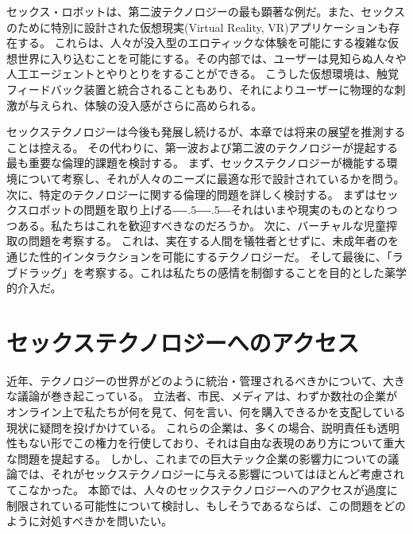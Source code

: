 \documentclass[paper=a4,book,openany]{jlreq}
\def\DDASH{―\kern-.5\zw―\kern-.5\zw―} %
\begin{document}
セックス・ロボットは、第二波テクノロジーの最も顕著な例だ。また、セックスのために特別に設計された仮想現実(Virtual Reality, VR)アプリケーションも存在する。
これらは、人々が没入型のエロティックな体験を可能にする複雑な仮想世界に入り込むことを可能にする。その内部では、ユーザーは見知らぬ人々や人工エージェントとやりとりをすることができる。
こうした仮想環境は、触覚フィードバック装置と統合されることもあり、それによりユーザーに物理的な刺激が与えられ、体験の没入感がさらに高められる。

セックステクノロジーは今後も発展し続けるが、本章では将来の展望を推測することは控える。
その代わりに、第一波および第二波のテクノロジーが提起する最も重要な倫理的課題を検討する。
まず、セックステクノロジーが機能する環境について考察し、それが人々のニーズに最適な形で設計されているかを問う。
次に、特定のテクノロジーに関する倫理的問題を詳しく検討する。
まずはセックスロボットの問題を取り上げる{\DDASH}それはいまや現実のものとなりつつある。私たちはこれを歓迎すべきなのだろうか。
次に、バーチャルな児童搾取の問題を考察する。
これは、実在する人間を犠牲者とせずに、未成年者のを通じた性的インタラクションを可能にするテクノロジーだ。
そして最後に、「ラブドラッグ」を考察する。これは私たちの感情を制御することを目的とした薬学的介入だ。

\section{セックステクノロジーへのアクセス}

近年、テクノロジーの世界がどのように統治・管理されるべきかについて、大きな議論が巻き起こっている。
立法者、市民、メディアは、わずか数社の企業がオンライン上で私たちが何を見て、何を言い、何を購入できるかを支配している現状に疑問を投げかけている。
これらの企業は、多くの場合、説明責任も透明性もない形でこの権力を行使しており、それは自由な表現のあり方について重大な問題を提起する。
しかし、これまでの巨大テック企業の影響力についての議論では、それがセックステクノロジーに与える影響についてはほとんど考慮されてこなかった。
本節では、人々のセックステクノロジーへのアクセスが過度に制限されている可能性について検討し、もしそうであるならば、この問題をどのように対処すべきかを問いたい。
\end{document}
